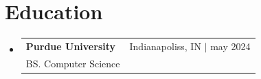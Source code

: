 \documentclass[letterpaper,11pt]{article}
\makeatletter
\newcommand{\resumeEducationHeading}[4]{
  \item
    \begin{tabular*}{0.97\textwidth}[t]{l@{\extracolsep{\fill}}r}
      \textbf{#1} & \scriptsize #2 \\
      \small#3 & \\
    \end{tabular*}
    \vspace{-3pt} %
}
\newcommand{\resumeProjectHeading}[2]{
    \vspace{3pt}\item
    \begin{tabular*}{0.97\textwidth}{l@{\extracolsep{\fill}}r}
      \small#1 & #2 \\
    \end{tabular*}\vspace{-9pt}
}
\newcommand{\resumeSubHeadingListStart}{\begin{itemize}[leftmargin=0.15in, label={}]}
\newcommand{\resumeSubHeadingListEnd}{\end{itemize}}
\newcommand{\resumeSectionBody}[1]{
  \vspace{0.7em}
  \small #1
  \vspace{-5pt}
}
\makeatother
\begin{document}








     
\section{Education}
  \resumeSubHeadingListStart
    \resumeEducationHeading
      {Purdue University}{Indianapoliss, IN $|$ may 2024}
      {BS. Computer Science\footnotesize{}}{\textbf{Relevant Coursework:} }
    
      
\resumeSubHeadingListEnd
\end{document}
